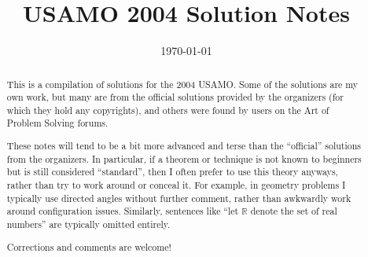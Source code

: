 \documentclass[11pt]{scrartcl}
\title{USAMO 2004 Solution Notes}
\date{\today}
\begin{document}
\maketitle

\begin{abstract}
This is a compilation of solutions
for the 2004 USAMO.
Some of the solutions are my own work,
but many are from the official solutions provided by the organizers
(for which they hold any copyrights),
and others were found by users on the Art of Problem Solving forums.

These notes will tend to be a bit more advanced and terse than the ``official''
solutions from the organizers.
In particular, if a theorem or technique is not known to beginners
but is still considered ``standard'', then I often prefer to
use this theory anyways, rather than try to work around or conceal it.
For example, in geometry problems I typically use directed angles
without further comment, rather than awkwardly work around configuration issues.
Similarly, sentences like ``let $\mathbb{R}$ denote the set of real numbers''
are typically omitted entirely.

Corrections and comments are welcome!
\end{abstract}

\tableofcontents
\newpage

\addtocounter{section}{-1}
\end{document}
